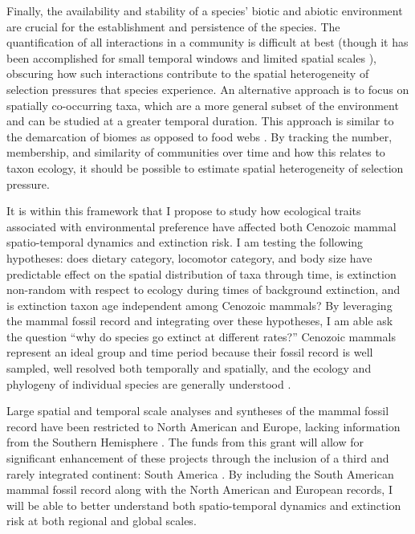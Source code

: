 \documentclass[11pt,letterpaper]{article}
\begin{document}
Finally, the availability and stability of a species' biotic and abiotic environment are crucial for the establishment and persistence of the species. The quantification of all interactions in a community is difficult at best (though it has been accomplished for small temporal windows and limited spatial scales \citep{Angielczyk2005,Mitchell2012,Roopnarine2007}), obscuring how such interactions contribute to the spatial heterogeneity of selection pressures that species experience. An alternative approach is to focus on spatially co-occurring taxa, which are a more general subset of the environment and can be studied at a greater temporal duration. This approach is similar to the demarcation of biomes as opposed to food webs \citep{Vilhena2013b}. By tracking the number, membership, and similarity of communities over time and how this relates to taxon ecology, it should be possible to estimate spatial heterogeneity of selection pressure.

It is within this framework that I propose to study how ecological traits associated with environmental preference have affected both Cenozoic mammal spatio-temporal dynamics and extinction risk. I am testing the following hypotheses: does dietary category, locomotor category, and body size have predictable effect on the spatial distribution of taxa through time, is extinction non-random with respect to ecology during times of background extinction, and is extinction taxon age independent among Cenozoic mammals? By leveraging the mammal fossil record and integrating over these hypotheses, I am able ask the question ``why do species go extinct at different rates?'' Cenozoic mammals represent an ideal group and time period because their fossil record is well sampled, well resolved both temporally and spatially, and the ecology and phylogeny of individual species are generally understood \citep{Alroy2009,Alroy2000g,Jernvall2002,Liow2008,Smith2004}. 

Large spatial and temporal scale analyses and syntheses of the mammal fossil record have been restricted to North American and Europe, lacking information from the Southern Hemisphere \citep{Jernvall2004,Jernvall2002,Fortelius2002,Janis2000,Alroy1996a,Alroy1998,Alroy2000g,Liow2008,Raia2006,Tomiya2013}. The funds from this grant will allow for significant enhancement of these projects through the inclusion of a third and rarely integrated continent: South America \citep{Stromberg2013,Marshall1982}. By including the South American mammal fossil record along with the North American and European records, I will be able to better understand both spatio-temporal dynamics and extinction risk at both regional and global scales. 
\end{document}
